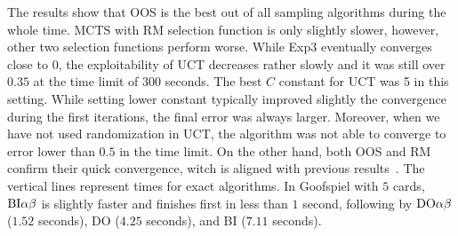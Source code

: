 The results show that OOS is the best out of all sampling algorithms during the whole time. 
MCTS with RM selection function is only slightly slower, however, other two selection functions perform worse. 
While Exp3 eventually converges close to $0$, the exploitability of UCT decreases rather slowly and it was still over $0.35$ at the time limit of $300$ seconds. 
The best $C$ constant for UCT was 5 in this setting. While setting lower constant typically improved slightly the 
convergence during the first iterations, the final error was always larger.
Moreover, when we have not used randomization in UCT, the algorithm was not able to converge to error lower than $0.5$ in the time limit. 
On the other hand, both OOS and RM confirm their quick convergence, witch is aligned with previous results~\cite{Lanctot13Goofspiel}.
The vertical lines represent times for exact algorithms.
In Goofspiel with $5$ cards, $\textrm{BI}\alpha\beta$ is slightly faster and finishes first in less than $1$ second, following by $\textrm{DO}\alpha\beta$ ($1.52$ seconds), \textsc{DO} ($4.25$ seconds), and \textsc{BI} ($7.11$ seconds).


